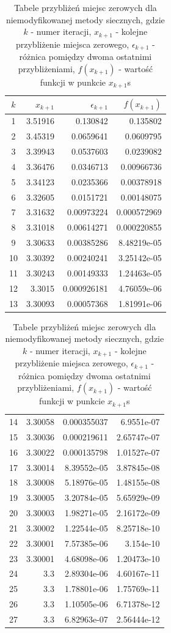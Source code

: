 \documentclass{article}
\begin{document}
\begin{table}[H]
\begin{center}
{\begin{tabular}{|c||r|r|r|}
$k$ & $x_{k+1}$ & $\epsilon _{k+1}$ & $f(x_{k+1})$ \\
\hline
1 & 3.51916 & 0.130842 & 0.135802 \\
2 & 3.45319 & 0.0659641 & 0.0609795 \\
3 & 3.39943 & 0.0537603 & 0.0239082 \\
4 & 3.36476 & 0.0346713 & 0.00966736 \\
5 & 3.34123 & 0.0235366 & 0.00378918 \\
6 & 3.32605 & 0.0151721 & 0.00148075 \\
7 & 3.31632 & 0.00973224 & 0.000572969 \\
8 & 3.31018 & 0.00614271 & 0.000220855 \\
9 & 3.30633 & 0.00385286 & 8.48219e-05 \\
10 & 3.30392 & 0.00240241 & 3.25142e-05 \\
11 & 3.30243 & 0.00149333 & 1.24463e-05 \\
12 & 3.3015 & 0.000926181 & 4.76059e-06 \\
13 & 3.30093 & 0.00057368 & 1.81991e-06 
\end{tabular}
\quad
\begin{tabular}{|c||r|r|r|}
14 & 3.30058 & 0.000355037 & 6.9551e-07 \\
15 & 3.30036 & 0.000219611 & 2.65747e-07 \\
16 & 3.30022 & 0.000135798 & 1.01527e-07 \\
17 & 3.30014 & 8.39552e-05 & 3.87845e-08 \\
18 & 3.30008 & 5.18976e-05 & 1.48155e-08 \\
19 & 3.30005 & 3.20784e-05 & 5.65929e-09 \\
20 & 3.30003 & 1.98271e-05 & 2.16172e-09 \\
21 & 3.30002 & 1.22544e-05 & 8.25718e-10 \\
22 & 3.30001 & 7.57385e-06 & 3.154e-10 \\
23 & 3.30001 & 4.68098e-06 & 1.20473e-10 \\
24 & 3.3 & 2.89304e-06 & 4.60167e-11 \\
25 & 3.3 & 1.78801e-06 & 1.75769e-11 \\
26 & 3.3 & 1.10505e-06 & 6.71378e-12 \\
27 & 3.3 & 6.82963e-07 & 2.56444e-12 
\end{tabular}}
\caption{Tabele przybliżeń miejsc zerowych dla niemodyfikowanej metody siecznych, gdzie $k$ - numer iteracji, $x_{k+1}$ - kolejne przybliżenie miejsca zerowego, $\epsilon _{k+1}$ - różnica pomiędzy dwoma ostatnimi przybliżeniami, $f(x_{k+1})$ - wartość funkcji w punkcie $x_{k+1}$s}
\end{center}
\end{table}
\end{document}
